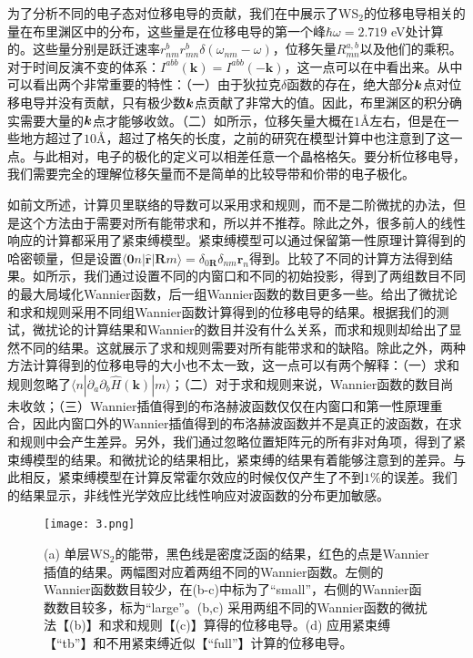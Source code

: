 为了分析不同的电子态对位移电导的贡献，我们在中展示了WS$_2$的位移电导相关的量在布里渊区中的分布，这些量是在位移电导的第一个峰$\hbar\omega = 2.719$ eV处计算的。这些量分别是跃迁速率$r_{nm}^{b}r_{mn}^{b}\delta(\omega_{nm}-\omega)$，位移矢量$R_{mn}^{a,b}$以及他们的乘积。对于时间反演不变的体系：$I^{abb}(\mathbf{k})=I^{abb}(-\mathbf{k})$，这一点可以在中看出来。从中可以看出两个非常重要的特性：（一）由于狄拉克$\delta$函数的存在，绝大部分$\boldsymbol{k}$点对位移电导并没有贡献，只有极少数$\boldsymbol{k}$点贡献了非常大的值。因此，布里渊区的积分确实需要大量的$\boldsymbol{k}$点才能够收敛。（二）如所示，位移矢量大概在$1$\AA 左右，但是在一些地方超过了$10$\AA，超过了格矢的长度，之前的研究\cite{fregoso_quantitative_2016}在模型计算中也注意到了这一点。与此相对，电子的极化的定义可以相差任意一个晶格格矢。要分析位移电导，我们需要完全的理解位移矢量而不是简单的比较导带和价带的电子极化\cite{young2012}。


如前文所述，计算贝里联络的导数可以采用求和规则，而不是二阶微扰的办法，但是这个方法由于需要对所有能带求和，所以并不推荐。除此之外，很多前人的线性响应的计算都采用了紧束缚模型。紧束缚模型可以通过保留第一性原理计算得到的哈密顿量，但是设置$\langle\mathbf{0}n|\hat{\mathbf{r}}|\mathbf{R}m\rangle=\delta_{0\mathbf{R}}\delta_{nm}\mathbf{r}_{n}$得到。比较了不同的计算方法得到结果。如所示，我们通过设置不同的内窗口和不同的初始投影，得到了两组数目不同的最大局域化Wannier函数，后一组Wannier函数的数目更多一些。给出了微扰论和求和规则采用不同组Wannier函数计算得到的位移电导的结果。根据我们的测试，微扰论的计算结果和Wannier的数目并没有什么关系，而求和规则却给出了显然不同的结果。这就展示了求和规则需要对所有能带求和的缺陷。除此之外，两种方法计算得到的位移电导的大小也不太一致，这一点可以有两个解释：（一）求和规则忽略了$\langle n|\partial_{a}\partial_{b}\hat{H}(\mathbf{k})|m\rangle$；（二）对于求和规则来说，Wannier函数的数目尚未收敛；（三）Wannier插值得到的布洛赫波函数仅仅在内窗口和第一性原理重合，因此内窗口外的Wannier插值得到的布洛赫波函数并不是真正的波函数，在求和规则中会产生差异。另外，我们通过忽略位置矩阵元的所有非对角项，得到了紧束缚模型的结果。和微扰论的结果相比，紧束缚的结果有着能够注意到的差异。与此相反，紧束缚模型在计算反常霍尔效应的时候仅仅产生了不到$1\%$的误差\cite{wang_textitab_2006}。我们的结果显示，非线性光学效应比线性响应对波函数的分布更加敏感。

\begin{figure}
	\begin{centering}
	\texttt{[image: 3.png]}
	\par\end{centering}
	\caption{\label{fig3} (a) 单层WS$_2$的能带，黑色线是密度泛函的结果，红色的点是Wannier插值的结果。两幅图对应着两组不同的Wannier函数。左侧的Wannier函数数目较少，在(b-c)中标为了“small”，右侧的Wannier函数数目较多，标为“large”。(b,c) 采用两组不同的Wannier函数的微扰法【(b)】和求和规则【(c)】算得的位移电导。(d) 应用紧束缚【“tb”】和不用紧束缚近似【“full”】计算的位移电导。} 
	
\end{figure}


